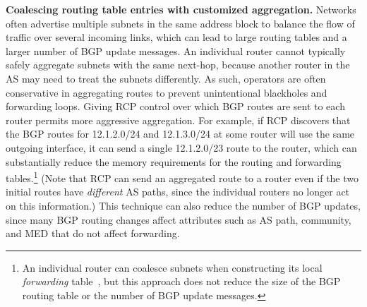 {\bf Coalescing routing table entries with customized aggregation.}
Networks often advertise multiple subnets in the same address block to
balance the flow of traffic over several incoming links, which can
lead to large routing tables and a larger number of BGP update
messages.  An individual router cannot typically safely aggregate
subnets with the same next-hop, because another router in the AS may
need to treat the subnets 
differently.  As 
such, operators are often conservative in aggregating routes to
prevent unintentional blackholes and forwarding loops.  Giving RCP
control over which BGP routes are sent to each router permits
more aggressive aggregation.  For example, if RCP
discovers that the BGP routes for 12.1.2.0/24 and 12.1.3.0/24 at some
router will use the same outgoing interface, it can send a single
12.1.2.0/23 route to the router, which can substantially reduce the
memory requirements for the routing and forwarding
tables.\footnote{An individual router can coalesce subnets when
constructing its local {\em forwarding\/} table~\cite{draves99}, but
this approach does not reduce the size of the BGP routing table or the
number of BGP update messages.}  (Note that RCP can send an
aggregated route to a router even if the two initial routes have {\em
different} AS paths, since the individual routers no longer act on
this information.)  This technique can also reduce the
number of BGP updates, since
many BGP routing changes affect attributes such as AS path, community,
and MED that do not affect forwarding.


